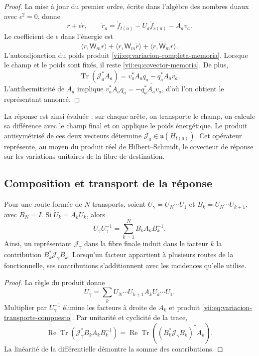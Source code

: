 \begin{proof}
La mise à jour du premier ordre, écrite dans l'algèbre des nombres duaux avec \(\epsilon^2=0\), donne
\[
 r+\epsilon\dot r,\qquad
 \dot r_a=\dot f_{t(a)}-U_a\dot f_{s(a)}-A_av_a.
\]
Le coefficient de \(\epsilon\) dans l'énergie est
\[
 \langle\dot r,\mathsf W_mr\rangle+
 \langle r,\mathsf W_m\dot r\rangle+
 \langle r,\dot{\mathsf W}_mr\rangle.
\]
L'autoadjonction du poids produit
\eqref{vii:eq:variacion-completa-memoria}. Lorsque le champ et le poids sont fixés, il reste
\eqref{vii:eq:covector-memoria}. De plus,
\[
 \operatorname{Tr}(\mathcal J_a^*A_a)
 =v_a^*A_aq_a-q_a^*A_av_a.
\]
L'antihermiticité de \(A_a\) implique
\(v_a^*A_aq_a=-\overline{q_a^*A_av_a}\), d'où l'on obtient
le représentant annoncé.
\end{proof}

La réponse est ainsi évaluée : sur chaque arête, on transporte le champ, on calcule sa différence avec le champ final et on applique le poids énergétique. Le produit antisymétrisé de ces deux vecteurs détermine \(\mathcal J_a\in\mathfrak u(H_{t(a)})\). Cet opérateur représente, au moyen du produit réel de Hilbert--Schmidt, le covecteur de réponse sur les variations unitaires de la fibre de destination.

\subsection{Composition et transport de la réponse}
\label{vii:subsec:composicion-respuesta}

\begin{proposition}
\label{vii:prop:composicion-respuesta}
Pour une route formée de \(N\) transports, soient
\(U_\gamma=U_N\cdots U_1\) et
\(B_k=U_N\cdots U_{k+1}\), avec \(B_N=I\).
Si \(\dot U_k=A_kU_k\), alors
\begin{equation}
 \dot U_\gamma U_\gamma^{-1}
 =\sum_{k=1}^N B_kA_kB_k^{-1}.
 \label{vii:eq:variacion-transporte-compuesto}
\end{equation}
Ainsi, un représentant \(\mathcal J_\gamma\) dans la fibre finale
induit dans le facteur \(k\) la contribution
\(B_k^*\mathcal J_\gamma B_k\). Lorsqu'un facteur appartient à plusieurs
routes de la fonctionnelle, ses contributions s'additionnent avec les incidences
qu'elle utilise.
\end{proposition}

\begin{proof}
La règle du produit donne
\[
 \dot U_\gamma=\sum_k
 U_N\cdots U_{k+1}A_kU_k\cdots U_1.
\]
Multiplier par \(U_\gamma^{-1}\) élimine les facteurs à droite
de \(A_k\) et produit \eqref{vii:eq:variacion-transporte-compuesto}.
Par unitarité et cyclicité de la trace,
\[
 \operatorname{Re}\operatorname{Tr}
   (\mathcal J_\gamma^*B_kA_kB_k^{-1})
 =\operatorname{Re}\operatorname{Tr}
   ((B_k^*\mathcal J_\gamma B_k)^*A_k).
\]
La linéarité de la différentielle démontre la somme des contributions.
\end{proof}

